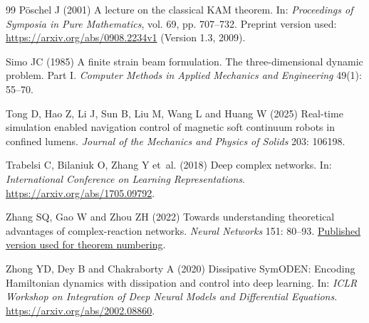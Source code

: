 \begin{thebibliography}{99}
P\"oschel J (2001) A lecture on the classical KAM theorem.
In: \textit{Proceedings of Symposia in Pure Mathematics}, vol. 69, pp. 707--732.
Preprint version used: \url{https://arxiv.org/abs/0908.2234v1} (Version 1.3, 2009).

Simo JC (1985) A finite strain beam formulation. The three-dimensional dynamic problem.
Part I. \textit{Computer Methods in Applied Mechanics and Engineering} 49(1): 55--70.

Tong D, Hao Z, Li J, Sun B, Liu M, Wang L and Huang W (2025)
Real-time simulation enabled navigation control of magnetic soft continuum robots in confined lumens.
\textit{Journal of the Mechanics and Physics of Solids} 203: 106198.

Trabelsi C, Bilaniuk O, Zhang Y et~al. (2018) Deep complex networks.
In: \textit{International Conference on Learning Representations}.
\url{https://arxiv.org/abs/1705.09792}.

Zhang SQ, Gao W and Zhou ZH (2022) Towards understanding theoretical advantages of
complex-reaction networks. \textit{Neural Networks} 151: 80--93.
\href{https://www.lamda.nju.edu.cn/zhangsq/papers/2022-CRNet-NN.pdf}{Published version used for theorem numbering}.

Zhong YD, Dey B and Chakraborty A (2020) Dissipative SymODEN: Encoding Hamiltonian
dynamics with dissipation and control into deep learning.
In: \textit{ICLR Workshop on Integration of Deep Neural Models and Differential Equations}.
\url{https://arxiv.org/abs/2002.08860}.
\end{thebibliography}
